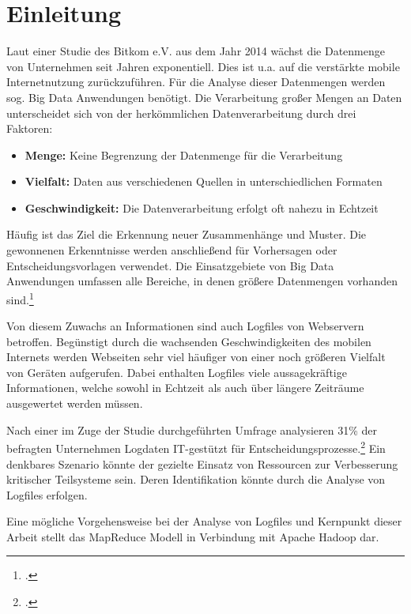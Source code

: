 
\chapter{Einleitung}\label{cha:Einleitung}
Laut einer Studie des Bitkom e.V. aus dem Jahr 2014 wächst die Datenmenge von Unternehmen seit Jahren exponentiell. Dies ist u.a. auf die verstärkte mobile Internetnutzung zurückzuführen. Für die Analyse dieser Datenmengen werden sog. Big Data Anwendungen benötigt. Die Verarbeitung großer Mengen an Daten unterscheidet sich von der herkömmlichen Datenverarbeitung durch drei Faktoren:

\begin{itemize}
	\item \textbf{Menge:} Keine Begrenzung der Datenmenge für die Verarbeitung
	\item \textbf{Vielfalt:} Daten aus verschiedenen Quellen in unterschiedlichen Formaten
	\item \textbf{Geschwindigkeit:} Die Datenverarbeitung erfolgt oft nahezu in Echtzeit
\end{itemize}

Häufig ist das Ziel die Erkennung neuer Zusammenhänge und Muster. Die gewonnenen Erkenntnisse werden anschließend für Vorhersagen oder Entscheidungsvorlagen verwendet. Die Einsatzgebiete von Big Data Anwendungen umfassen alle Bereiche, in denen größere Datenmengen vorhanden sind.\footcite[Vgl.][S. 3]{Bitkom.2014}

Von diesem Zuwachs an Informationen sind auch Logfiles von Webservern betroffen. Begünstigt durch die wachsenden Geschwindigkeiten des mobilen Internets werden Webseiten sehr viel häufiger von einer noch größeren Vielfalt von Geräten aufgerufen. Dabei enthalten Logfiles viele aussagekräftige Informationen, welche sowohl in Echtzeit als auch über längere Zeiträume ausgewertet werden müssen.

Nach einer im Zuge der Studie durchgeführten Umfrage analysieren 31\% der befragten Unternehmen Logdaten IT-gestützt für Entscheidungsprozesse.\footcite[Vgl.][S. 8]{Bitkom.2014} Ein denkbares Szenario könnte der gezielte Einsatz von Ressourcen zur Verbesserung kritischer Teilsysteme sein. Deren Identifikation könnte durch die Analyse von Logfiles erfolgen.

Eine mögliche Vorgehensweise bei der Analyse von Logfiles und Kernpunkt dieser Arbeit stellt das MapReduce Modell in Verbindung mit Apache Hadoop dar.

